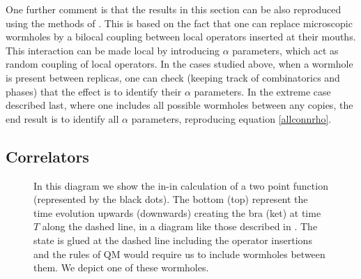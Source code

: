 \documentclass[12pt]{article}
\numberwithin{equation}{section}
\begin{document}
One further comment is that the results in this section can be also reproduced using the methods of \cite{Klebanov:1988eh}. This is based on the fact that one can replace microscopic wormholes by a bilocal coupling between local operators inserted at their mouths. This interaction can be made local by introducing $\alpha$ parameters, which act as random coupling of local operators. In the cases studied above, when a wormhole is present between replicas, one can check (keeping track of combinatorics and phases) that the effect is to identify their $\alpha$ parameters. In the extreme case described last, where one includes all possible wormholes between any copies, the end result is to identify all $\alpha$ parameters, reproducing equation \eqref{allconnrho}.

\subsection{Correlators} 

\begin{figure}[t!]
\begin{center}
 \caption{\label{fig:whcorr} In this diagram we show the in-in calculation of a two point function (represented by the black dots). The bottom (top) represent the time evolution upwards (downwards) creating the bra (ket) at time $T$ along the dashed line, in a diagram like those described in \cite{GiSl3}. The state is glued at the dashed line including the operator insertions and the rules of QM would require us to include wormholes between them. We depict one of these wormholes.}
\end{center}
\end{figure}
\end{document}
